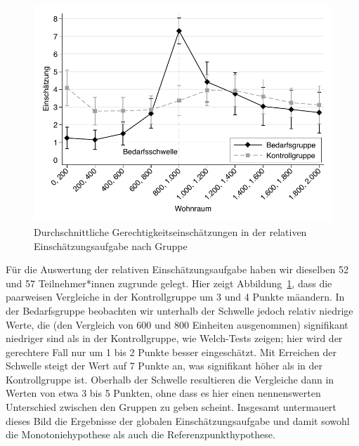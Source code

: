\documentclass[justified,nobib,nohyper,symmetric,twoside]{tufte-book}
\begin{document}
\begin{figure}[t]\label{fig:abbildung_2}
   \center
   \includegraphics[width=0.99\linewidth]{figure_2.pdf}
   \caption{Durchschnitt\-liche Gerechtigkeitseinschätzungen in der relativen Einschätzungsaufgabe nach Gruppe}
\end{figure}

Für die Auswertung der relativen Einschätzungsaufgabe haben wir dieselben 52 und 57 Teilnehmer*innen zugrunde gelegt.
Hier zeigt Abbildung~\ref{fig:abbildung_2}, dass die paarweisen Vergleiche in der Kontrollgruppe um 3 und 4 Punkte mäandern.
In der Bedarfsgruppe beobachten wir unterhalb der Schwelle jedoch relativ niedrige Werte, die (den Vergleich von 600 und 800 Einheiten ausgenommen) signifikant niedriger sind als in der Kontrollgruppe, wie Welch-Tests zeigen; hier wird der gerechtere Fall nur um 1 bis 2 Punkte besser eingeschätzt.
Mit Erreichen der Schwelle steigt der Wert auf 7 Punkte an, was signifikant höher als in der Kontrollgruppe ist.
Oberhalb der Schwelle resultieren die Vergleiche dann in Werten von etwa 3 bis 5 Punkten, ohne dass es hier einen nennenswerten Unterschied zwischen den Gruppen zu geben scheint.
Insgesamt untermauert dieses Bild die Ergebnisse der globalen Einschätzungsaufgabe und damit sowohl die Monotoniehypothese als auch die Referenzpunkthypothese.
\end{document}
